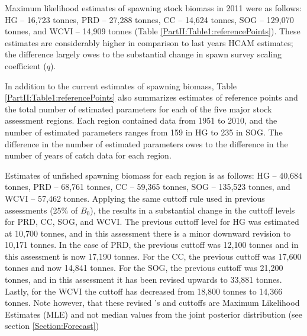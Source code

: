 Maximum likelihood estimates of spawning stock biomass in 2011 were as follows: HG -- 16,723 tonnes, PRD -- 27,288 tonnes, CC -- 14,624 tonnes, SOG -- 129,070 tonnes, and WCVI -- 14,909 tonnes (Table \ref{PartII:Table1:referencePoints}).  These estimates are considerably higher in comparison to last years HCAM estimates; the difference largely owes to the substantial change in spawn survey scaling coefficient ($q$).

In addition to the current estimates of spawning biomass, Table \ref{PartII:Table1:referencePoints} also summarizes estimates of reference points and the total number of estimated parameters for each of the five major stock assessment regions.  Each region contained data from 1951 to 2010, and the number of estimated parameters ranges from 159 in HG to 235 in SOG.  The difference in the number of estimated parameters owes to the difference in the number of years of catch data for each region.

Estimates of unfished spawning biomass for each region is as follows: HG -- 40,684 tonnes, PRD -- 68,761 tonnes, CC -- 59,365 tonnes, SOG -- 135,523 tonnes, and WCVI -- 57,462 tonnes.  Applying the same cuttoff rule used in previous assessments (25\% of $B_0$), the results in a substantial change in the cuttoff levels for PRD, CC, SOG, and WCVI.  The previous cuttoff level for HG was estimated at 10,700 tonnes, and in this assessment there is a minor downward revision to 10,171 tonnes.  In the case of PRD, the previous cuttoff was 12,100 tonnes and in this assessment is now 17,190 tonnes.  For the CC, the previous cuttoff was 17,600 tonnes and now 14,841 tonnes.  For the SOG, the previous cuttoff was 21,200 tonnes, and in this assessment it has been revised upwards to 33,881 tonnes.  Lastly, for the WCVI the cuttoff has decreased from 18,800 tonnes to 14,366 tonnes. Note however, that these revised \bo's and cuttoffs are Maximum Likelihood Estimates (MLE) and not median values from the joint posterior distribution (see section \ref{Section:Forecast})





